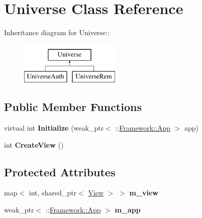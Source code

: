 \hypertarget{classUniverse}{
\section{Universe Class Reference}
\label{classUniverse}
}
Inheritance diagram for Universe::\begin{figure}[H]
\begin{center}
\leavevmode
\includegraphics[height=2cm]{classUniverse}
\end{center}
\end{figure}
\subsection*{Public Member Functions}
\begin{DoxyCompactItemize}
\item 
\hypertarget{classUniverse_ac0fc8ada80d6613ea074f759a57ee6cf}{
virtual int {\bfseries Initialize} (weak\_\-ptr$<$ ::\hyperlink{classFramework_1_1App}{Framework::App} $>$ app)}
\label{classUniverse_ac0fc8ada80d6613ea074f759a57ee6cf}

\item 
\hypertarget{classUniverse_a55a7a485fb5f2a81ceae2c8fba8a35d8}{
int {\bfseries CreateView} ()}
\label{classUniverse_a55a7a485fb5f2a81ceae2c8fba8a35d8}

\end{DoxyCompactItemize}
\subsection*{Protected Attributes}
\begin{DoxyCompactItemize}
\item 
\hypertarget{classUniverse_a34c60613ef224e2eb25830c924ac6f35}{
map$<$ int, shared\_\-ptr$<$ \hyperlink{classView}{View} $>$ $>$ {\bfseries m\_\-view}}
\label{classUniverse_a34c60613ef224e2eb25830c924ac6f35}

\item 
\hypertarget{classUniverse_abdc9acb24e5c0d2fdae26f3b8296af8b}{
weak\_\-ptr$<$ ::\hyperlink{classFramework_1_1App}{Framework::App} $>$ {\bfseries m\_\-app}}
\label{classUniverse_abdc9acb24e5c0d2fdae26f3b8296af8b}

\end{DoxyCompactItemize}
